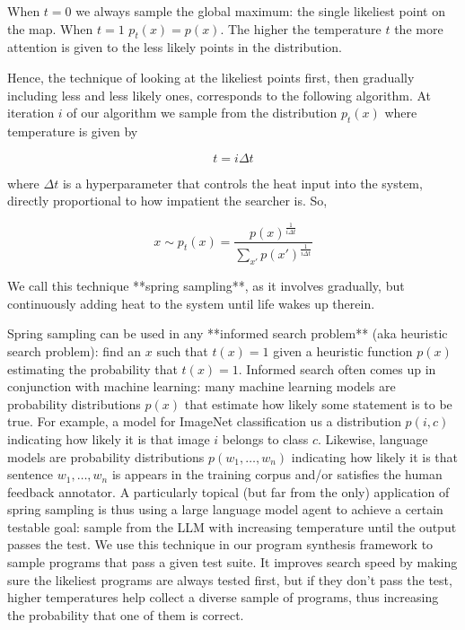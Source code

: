 When $t=0$ we always sample the global maximum: the single likeliest point on the map. 
When $t=1$ $p_t(x)=p(x)$.
The higher the temperature $t$ the more attention is given to the less likely points in the distribution.

Hence, the technique of looking at the likeliest points first, then gradually including less and less likely ones, corresponds to the following algorithm. At iteration $i$ of our algorithm we sample from the distribution $p_t(x)$ where temperature is given by

\begin{equation}
t = i \Delta t
\end{equation}

where $\Delta t$ is a hyperparameter that controls the heat input into the system, directly proportional to how impatient the searcher is. So,

\begin{equation}
x \sim p_t(x) = \frac{p(x)^{\frac{1}{i \Delta t}}}{\sum_{x'} p(x')^{\frac{1}{i \Delta t}}}
\end{equation}

We call this technique **spring sampling**, as it involves gradually, but continuously adding heat to the system until life wakes up therein.

Spring sampling can be used in any **informed search problem** (aka heuristic search problem): find an $x$ such that $t(x)=1$ given a heuristic function $p(x)$ estimating the probability that $t(x)=1$. 
Informed search often comes up in conjunction with machine learning: many machine learning models are probability distributions $p(x)$ that estimate how likely some statement is to be true.
For example, a model for ImageNet classification \cite{dengImagenetLargescaleHierarchical2009} us a distribution $p(i,c)$ indicating how likely it is that image $i$ belongs to class $c$.
Likewise, language models are probability distributions $p(w_1,\dots,w_n)$ indicating how likely it is that sentence $w_1,\dots,w_n$ is appears in the training corpus and/or satisfies the human feedback annotator.
A particularly topical (but far from the only) application of spring sampling is thus using a large language model agent to achieve a certain testable goal: sample from the LLM with increasing temperature until the output passes the test.
We use this technique in our program synthesis framework to sample programs that pass a given test suite.
It improves search speed by making sure the likeliest programs are always tested first, but if they don't pass the test, higher temperatures help collect a diverse sample of programs, thus increasing the probability that one of them is correct.

